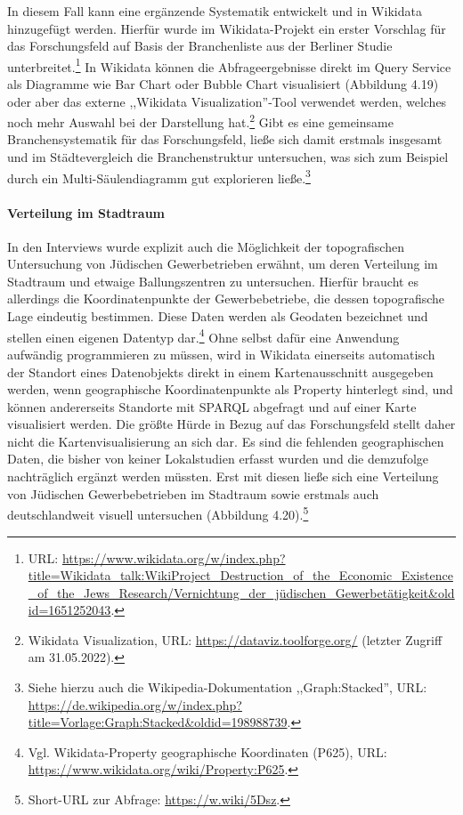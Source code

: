 In diesem Fall kann eine ergänzende Systematik entwickelt und in Wikidata hinzugefügt werden. Hierfür wurde im Wikidata-Projekt ein erster Vorschlag für das Forschungsfeld auf Basis der Branchenliste aus der Berliner Studie unterbreitet.\footnote{URL: \url{https://www.wikidata.org/w/index.php?title=Wikidata_talk:WikiProject\_Destruction\_of\_the\_Economic\_Existence\_of\_the\_Jews\_Research/Vernichtung\_der\_jüdischen_Gewerbetätigkeit\&oldid=1651252043}.} In Wikidata können die Abfrageergebnisse direkt im Query Service als Diagramme wie Bar Chart oder Bubble Chart visualisiert (Abbildung 4.19) oder aber das externe ,,Wikidata Visualization''-Tool verwendet werden, welches noch mehr Auswahl bei der Darstellung hat.\footnote{Wikidata Visualization, URL: \url{https://dataviz.toolforge.org/} (letzter Zugriff am 31.05.2022).} Gibt es eine gemeinsame Branchensystematik für das Forschungsfeld, ließe sich damit erstmals insgesamt und im Städtevergleich die Branchenstruktur untersuchen, was sich zum Beispiel durch ein Multi-Säulendiagramm gut explorieren ließe.\footnote{Siehe hierzu auch die Wikipedia-Dokumentation ,,Graph:Stacked'', URL: \url{https://de.wikipedia.org/w/index.php?title=Vorlage:Graph:Stacked\&oldid=198988739}.}

\paragraph{Verteilung im Stadtraum}

In den Interviews wurde explizit auch die Möglichkeit der topografischen Untersuchung von Jüdischen Gewerbetrieben erwähnt, um deren Verteilung im Stadtraum und etwaige Ballungszentren zu untersuchen. Hierfür braucht es allerdings die Koordinatenpunkte der Gewerbebetriebe, die dessen topografische Lage eindeutig bestimmen. Diese Daten werden als Geodaten bezeichnet und stellen einen eigenen Datentyp dar.\footnote{Vgl. Wikidata-Property geographische Koordinaten (P625), URL: \url{https://www.wikidata.org/wiki/Property:P625}.} Ohne selbst dafür eine Anwendung aufwändig programmieren zu müssen, wird in Wikidata einerseits automatisch der Standort eines Datenobjekts direkt in einem Kartenausschnitt ausgegeben werden, wenn geographische Koordinatenpunkte als Property hinterlegt sind, und können andererseits Standorte mit SPARQL abgefragt und auf einer Karte visualisiert werden. Die größte Hürde in Bezug auf das Forschungsfeld stellt daher nicht die Kartenvisualisierung an sich dar. Es sind die fehlenden geographischen Daten, die bisher von keiner Lokalstudien erfasst wurden und die demzufolge nachträglich ergänzt werden müssten. Erst mit diesen ließe sich eine Verteilung von Jüdischen Gewerbebetrieben im Stadtraum sowie erstmals auch deutschlandweit visuell untersuchen (Abbildung 4.20).\footnote{Short-URL zur Abfrage: \url{https://w.wiki/5Dsz}.}

